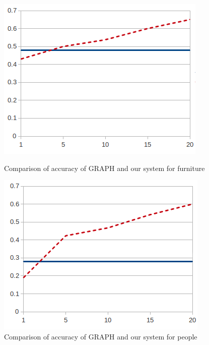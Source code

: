 \begin{figure}[ht]
\begin{minipage}{0.39\linewidth}
\centering
\includegraphics[width=\textwidth]{images/furniturePrec.png}
\caption{Comparison of accuracy of GRAPH and our system for furniture}
\label{graficoPresicionFurniture}
\end{minipage}
\begin{minipage}{0.39\linewidth}
\centering
\includegraphics[width=\textwidth]{images/precP.png}
\caption{Comparison of accuracy of GRAPH and our system for people}
\label{graficoPresicionPeople}
\end{minipage}
\begin{minipage}{0.20\linewidth}


\end{minipage}
\end{figure}
